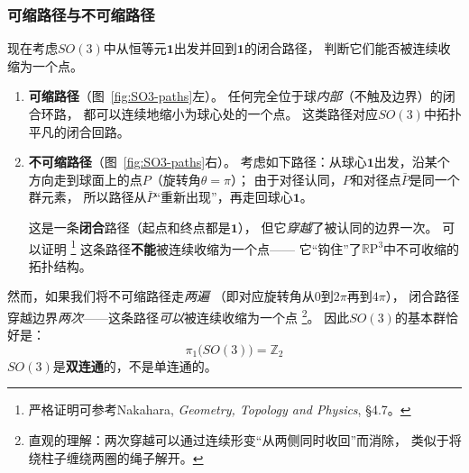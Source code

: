 \subsubsection*{可缩路径与不可缩路径}

现在考虑$SO(3)$中从恒等元$\mathbf{1}$出发并回到$\mathbf{1}$的闭合路径，
判断它们能否被连续收缩为一个点。

\begin{enumerate}
    \item \textbf{可缩路径}（图~\ref{fig:SO3-paths}左）。
    任何完全位于球\emph{内部}（不触及边界）的闭合环路，
    都可以连续地缩小为球心处的一个点。
    这类路径对应$SO(3)$中拓扑平凡的闭合回路。

    \item \textbf{不可缩路径}（图~\ref{fig:SO3-paths}右）。
    考虑如下路径：从球心$\mathbf{1}$出发，沿某个方向走到球面上的点$P$（旋转角$\theta=\pi$）；
    由于对径认同，$P$和对径点$\bar{P}$是同一个群元素，
    所以路径从$\bar{P}$``重新出现''，再走回球心$\mathbf{1}$。
    
    这是一条\textbf{闭合}路径（起点和终点都是$\mathbf{1}$），
    但它\emph{穿越}了被认同的边界一次。
    可以证明%
    \footnote{严格证明可参考Nakahara, \textit{Geometry, Topology and Physics}, \S4.7。}%
    这条路径\textbf{不能}被连续收缩为一个点——
    它``钩住''了$\mathbb{R}\mathrm{P}^3$中不可收缩的拓扑结构。
\end{enumerate}

然而，如果我们将不可缩路径走\emph{两遍}%
（即对应旋转角从$0$到$2\pi$再到$4\pi$），
闭合路径穿越边界\emph{两次}——这条路径\emph{可以}被连续收缩为一个点%
\footnote{%
直观的理解：两次穿越可以通过连续形变``从两侧同时收回''而消除，
类似于将绕柱子缠绕两圈的绳子解开。}。
因此$SO(3)$的基本群恰好是：
\begin{equation}\label{eq:pi1-SO3}
    \boxed{\pi_1\bigl(SO(3)\bigr) = \mathbb{Z}_2}
\end{equation}
$SO(3)$是\textbf{双连通}的，不是单连通的。

